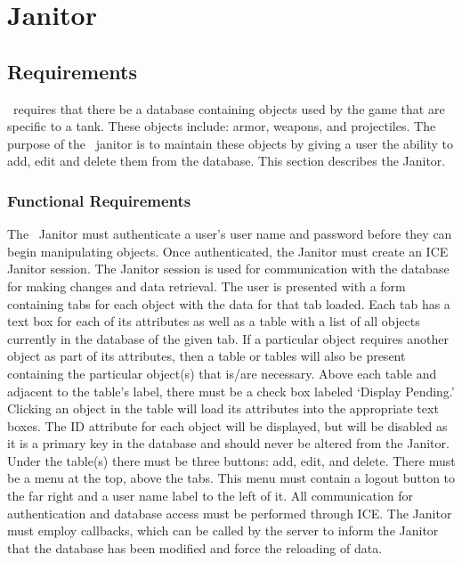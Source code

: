 %

\chapter{Janitor}
\label{janitor}

\section{Requirements}

\VTank\ requires that there be a database containing objects used by the game that are specific to a tank. These objects include: armor, weapons, and projectiles. The purpose of the \VTank\ janitor is to maintain these objects by giving a user the ability to add, edit and delete them from the database. This section describes the Janitor.

\subsection{Functional Requirements}

The \VTank\ Janitor must authenticate a user's user name and password before they can begin manipulating objects. Once authenticated, the Janitor must create an ICE Janitor session.  The Janitor session is used for communication with the database for making changes and data retrieval. The user is presented with a form containing tabs for each object with the data for that tab loaded. Each tab has a text box for each of its attributes as well as a table with a list of all objects currently in the database of the given tab. If a particular object requires another object as part of its attributes, then a table or tables will also be present containing the particular object(s) that is/are necessary. Above each table and adjacent to the table's label, there must be a check box labeled `Display Pending.'  Clicking an object in the table will load its attributes into the appropriate text boxes.  The ID attribute for each object will be displayed, but will be disabled as it is a primary key in the database and should never be altered from the Janitor.  Under the table(s) there must be three buttons: add, edit, and delete.  There must be a menu at the top, above the tabs.  This menu must contain a logout button to the far right and a user name label to the left of it.  All communication for authentication and database access must be performed through ICE.  The Janitor must employ callbacks, which can be called by the server to inform the Janitor that the database has been modified and force the reloading of data.

